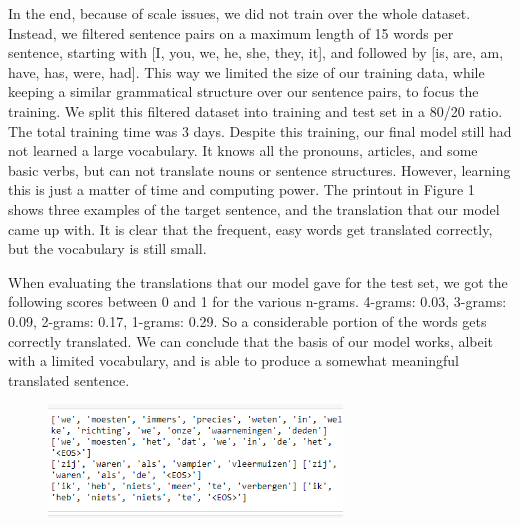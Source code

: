 \documentclass[11pt]{article}
\begin{document}
In the end, because of scale issues, we did not train over the whole dataset. Instead, we filtered sentence pairs on a maximum length of 15 words per sentence, starting with [I, you, we, he, she, they, it], and followed by [is, are, am, have, has, were, had]. This way we limited the size of our training data, while keeping a similar grammatical structure over our sentence pairs, to focus the training. We split this filtered dataset into training and test set in a 80/20 ratio. The total training time was 3 days. Despite this training, our final model still had not learned a large vocabulary. It knows all the pronouns, articles, and some basic verbs, but can not translate nouns or sentence structures. However, learning this is just a matter of time and computing power. The printout in Figure 1 shows three examples of the target sentence, and the translation that our model came up with. It is clear that the frequent, easy words get translated correctly, but the vocabulary is still small.

When evaluating the translations that our model gave for the test set, we got the following scores between 0 and 1 for the various n-grams. 4-grams: 0.03, 3-grams: 0.09, 2-grams: 0.17, 1-grams: 0.29. So a considerable portion of the words gets correctly translated. We can conclude that the basis of our model works, albeit with a limited vocabulary, and is able to produce a somewhat meaningful translated sentence.

\begin{figure}[h]
    \includegraphics[width=7.8cm]{Screenshot (3).png}
    \label{Figure 1}
\end{figure}
\end{document}
